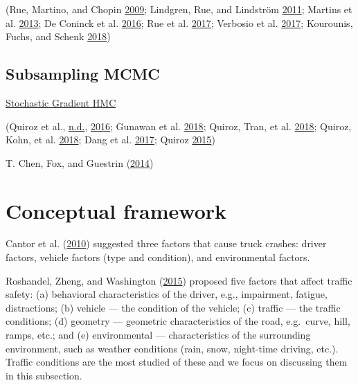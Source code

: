 \documentclass[12pt]{book}
\numberwithin{equation}{chapter}
\begin{document}
(Rue, Martino, and Chopin \protect\hyperlink{ref-Havard2009}{2009}; Lindgren, Rue, and Lindström \protect\hyperlink{ref-Lindgren2011}{2011}; Martins et al. \protect\hyperlink{ref-Thiago2013}{2013}; De Coninck et al. \protect\hyperlink{ref-Coninck2016}{2016}; Rue et al. \protect\hyperlink{ref-Rue2017}{2017}; Verbosio et al. \protect\hyperlink{ref-Verbosio2017}{2017}; Kourounis, Fuchs, and Schenk \protect\hyperlink{ref-Kourounis2018}{2018})

\hypertarget{subsampling-mcmc}{%
\subsection{Subsampling MCMC}\label{subsampling-mcmc}}

\href{https://blog.csdn.net/u013841458/article/details/82495450}{Stochastic Gradient HMC}

(Quiroz et al., \protect\hyperlink{ref-quirozsubsampling}{n.d.}, \protect\hyperlink{ref-quiroz2016block}{2016}; Gunawan et al. \protect\hyperlink{ref-gunawan2018subsampling}{2018}; Quiroz, Tran, et al. \protect\hyperlink{ref-quiroz2018speeding}{2018}; Quiroz, Kohn, et al. \protect\hyperlink{ref-quiroz2018speeding1}{2018}; Dang et al. \protect\hyperlink{ref-dang2017hamiltonian}{2017}; Quiroz \protect\hyperlink{ref-quiroz2015bayesian}{2015})

T. Chen, Fox, and Guestrin (\protect\hyperlink{ref-chen2014stochastic}{2014})

\hypertarget{conceptual-framework}{%
\section{Conceptual framework}\label{conceptual-framework}}

Cantor et al. (\protect\hyperlink{ref-cantor2010driver}{2010}) suggested three factors that cause truck crashes: driver factors, vehicle factors (type and condition), and environmental factors.

Roshandel, Zheng, and Washington (\protect\hyperlink{ref-roshandel2015impact}{2015}) proposed five factors that affect traffic safety: (a) behavioral characteristics of the driver, e.g., impairment, fatigue, distractions; (b) vehicle --- the condition of the vehicle; (c) traffic --- the traffic conditions; (d) geometry --- geometric characteristics of the road, e.g.~curve, hill, ramps, etc.; and (e) environmental --- characteristics of the surrounding environment, such as weather conditions (rain, snow, night-time driving, etc.). Traffic conditions are the most studied of these and we focus on discussing them in this subsection.
\end{document}
